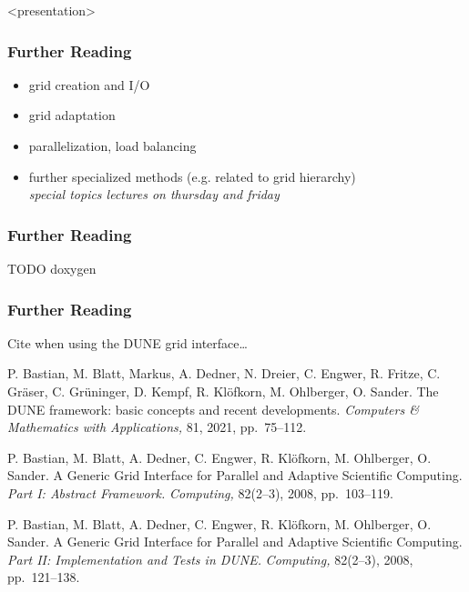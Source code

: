 \documentclass[aspectratio=169,11pt]{beamer}
\theoremstyle{definition}
\begin{document}
\begin{onlyenv}<presentation>
  \begin{frame}
    \frametitle{Further Reading}
    \begin{itemize}
    \item grid creation and I/O\\
      \medskip
      \pause\pause
      \bigskip
    \item grid adaptation
      \medskip
    \item parallelization, load balancing
      \medskip
    \item further specialized methods (e.g. related to grid hierarchy)\\
      \pause
      \medskip
      \rightarrownice \emph{special topics lectures on thursday and friday}
    \end{itemize}
  \end{frame}
\end{onlyenv}

\begin{frame}
  \frametitle{Further Reading}
  TODO doxygen
\end{frame}

\begin{frame} \frametitle<presentation>{Further Reading}
    \small
    Cite when using the DUNE grid interface\ldots
    \begingroup
    \renewcommand{\section}[2]{}%
    \begin{thebibliography}{}

      P. Bastian, M. Blatt, Markus, A. Dedner, N. Dreier, C. Engwer, R. Fritze, C. Gr{\"a}ser, C. Gr{\"u}ninger, D. Kempf, R. Kl{\"o}fkorn, M. Ohlberger, O. Sander.
      \newblock The DUNE framework: basic concepts and recent developments.
      \newblock \emph{Computers \& Mathematics with Applications,} 81, 2021, pp.~75--112.

P. Bastian, M. Blatt, A. Dedner, C. Engwer, R. Klöfkorn, M. Ohlberger,
O. Sander.
\newblock A Generic Grid Interface for Parallel and Adaptive
Scientific Computing.
\emph{Part I: Abstract Framework.}
\newblock \emph{Computing,} 82(2--3), 2008, pp.~103--119.

P. Bastian, M. Blatt, A. Dedner, C. Engwer, R. Klöfkorn, M. Ohlberger,
O. Sander.
\newblock A Generic Grid Interface for Parallel and Adaptive
Scientific Computing.
\emph{Part II: Implementation and Tests in DUNE.}
\newblock \emph{Computing,} 82(2--3), 2008, pp.~121--138.

\end{thebibliography}
    \endgroup
\end{frame}
\end{document}
